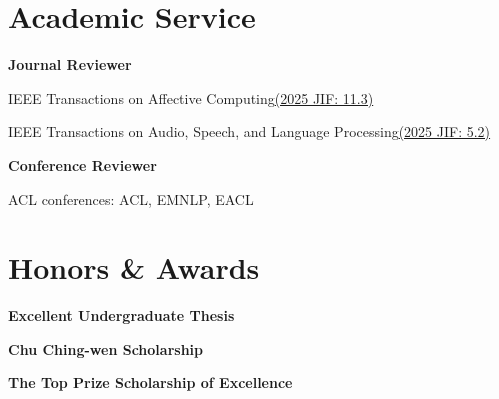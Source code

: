\documentclass[11pt,a4paper]{article}
\begin{document}
\section{Academic Service}
\textbf{Journal Reviewer}\par
{\cvbody
IEEE Transactions on Affective Computing\enspace\href{https://open.ieee.org/wp-content/uploads/IEEE-Title-List-September-2026-CAPES.pdf}{{\cvsmall (2025 JIF: 11.3)}}\hfill{}\par
\addvspace{\cvitemsep}
IEEE Transactions on Audio, Speech, and Language Processing\enspace\href{https://open.ieee.org/wp-content/uploads/IEEE-Title-List-September-2026-CAPES.pdf}{{\cvsmall (2025 JIF: 5.2)}}\hfill{}\par}
\addvspace{\cventrysep}
\textbf{Conference Reviewer}\par
{\cvbody *ACL conferences: ACL, EMNLP, EACL\hfill{}\par}

\section{Honors \& Awards}
\textbf{Excellent Undergraduate Thesis}\hfill{}\par
{}
\addvspace{\cventrysep}
\textbf{Chu Ching-wen Scholarship}\hfill{}\par
{}
\addvspace{\cventrysep}
\textbf{The Top Prize Scholarship of Excellence}\hfill{}\par
{}
\end{document}
